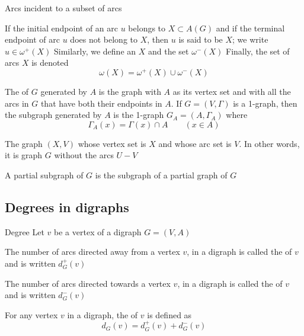 \documentclass[aspectratio=43]{beamer}
\begin{document}
\begin{frame}{Arcs incident to a subset of arcs}
	\begin{definition}
		If the initial endpoint of an arc $u$ belongs to $X\subset A(G)$ and if the terminal endpoint of arc $u$ does not belong to $X$, then $u$ is said to be  $X$; we write $u\in\omega^+(X)$
		\vskip0.2cm
		Similarly, we define an  $X$ and the set $\omega^-(X)$
		\vskip0.2cm
		Finally, the set of arcs  $X$ is denoted
		\[
		\omega(X) = \omega^+(X)\cup\omega^-(X)
		\]
	\end{definition}
\end{frame}

\begin{frame}
	\begin{definition}
		The  of $G$ generated by $A$ is the graph with $A$ as its vertex set and with all the arcs in $G$ that have both their endpoints in $A$. If $G=(V,\Gamma)$ is a 1-graph, then the subgraph generated by $A$ is the 1-graph $G_A=(A,\Gamma_A)$ where
		\[
		\Gamma_A(x)=\Gamma(x)\cap A\qquad (x\in A)
		\]
	\end{definition}
	\vfill
	\begin{definition}
		\label{def:partial_graph}
		The graph $(X,V)$ whose vertex set is $X$ and whose arc set is $V$. 
		In other words, it is graph $G$ without the arcs $U-V$
	\end{definition}
	\vfill
	\begin{definition}
		A partial subgraph of $G$ is the subgraph of a partial graph of $G$
	\end{definition}
\end{frame}



\subsection{Degrees in digraphs}
\begin{frame}{Degree}
	Let $v$ be a vertex of a digraph $G=(V,A)$
	\begin{definition}
	The number of arcs directed away from a vertex $v$, in a digraph is called the  of $v$ and is written $d^+_G(v)$
	\end{definition}
	\begin{definition}
	The number of arcs directed towards a vertex $v$, in a digraph is called the  of $v$ and is written $d^-_G(v)$
	\end{definition}
	\begin{definition}[{Degree}]
	For any vertex $v$ in a digraph, the  of $v$ is defined as 
	\[
		d_G(v)=d^+_G(v)+d^-_G(v)
	\]
	\end{definition}
\end{frame}
\end{document}
